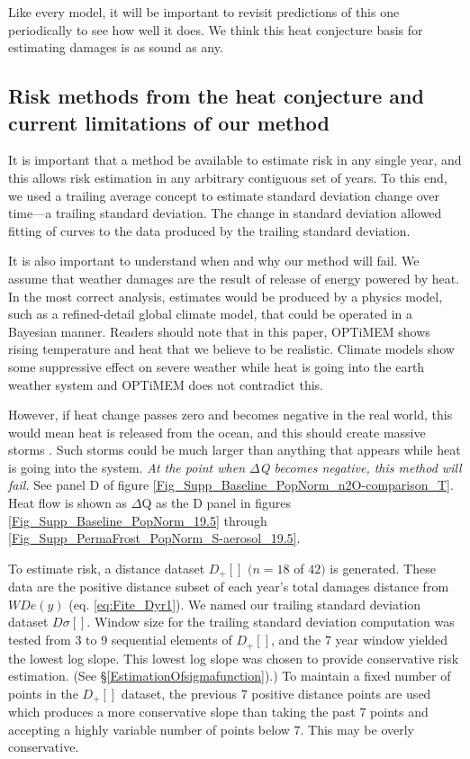 \documentclass{article}
\begin{document}
Like every model, it will be important to revisit predictions of this one periodically to see how well it does. We think this heat conjecture basis for estimating damages is as sound as any.

\subsection{Risk methods from the heat conjecture and current limitations of our method}
\label{lb:RiskMethods}
It is important that a method be available to estimate risk in any single year, and this allows risk estimation in any arbitrary contiguous set of years. To this end, we used a trailing average concept to estimate standard deviation change over time---a trailing standard deviation. The change in standard deviation allowed fitting of curves to the data produced by the trailing standard deviation.

It is also important to understand when and why our method will fail. We assume that weather damages are the result of release of energy powered by heat.  In the most correct analysis, estimates would be produced by a physics model, such as a refined-detail global climate model, that could be operated in a Bayesian manner. Readers should note that in this paper, OPTiMEM shows rising temperature and heat that we believe to be realistic. Climate models show some suppressive effect on severe weather while heat is going into the earth weather system and OPTiMEM does not contradict this. 

However, if heat change passes zero and becomes negative in the real world, this would mean heat is released from the ocean, and this should create massive storms \cite{Hansen2016IceMeltSeaLevelRiseAndSuperstorms}. Such storms could be much larger than anything that appears while heat is going into the system. \emph{At the point when $\Delta$Q becomes negative, this method will fail.} See panel D of figure \ref{Fig_Supp_Baseline_PopNorm_n2O-comparison_T}. Heat flow is shown as $\Delta$Q as the D panel in figures \ref{Fig_Supp_Baseline_PopNorm_19.5} through \ref{Fig_Supp_PermaFrost_PopNorm_S-aerosol_19.5}.


To estimate risk, a distance dataset $D_+[]$ $(n=18$ of $42)$ is generated. These data are the positive distance subset of each year's total damages distance from $WDe(y)$ (eq. \ref{eq:Fite_Dyr1}). We named our trailing standard deviation dataset $D\sigma[]$. Window size for the trailing standard deviation computation was tested from 3 to 9 sequential elements of $D_+[]$, and the 7 year window yielded the lowest log slope. This lowest log slope was chosen to provide conservative risk estimation. (See \S \ref{EstimationOfsigmafunction}).) To maintain a fixed number of points in the $D_+[]$ dataset, the previous 7 positive distance points are used which produces a more conservative slope than taking the past 7 points and accepting a highly variable number of points below 7. This may be overly conservative.
\end{document}
